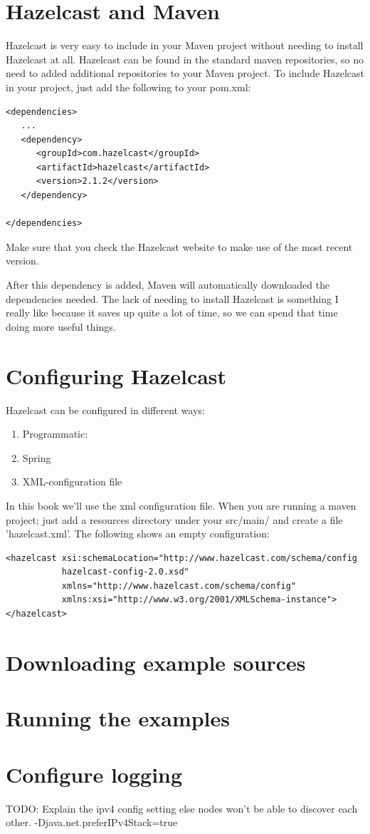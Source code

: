 \section{Hazelcast and Maven}
Hazelcast is very easy to include in your Maven project without needing to install Hazelcast at all. Hazelcast can be found in the standard maven repositories, so no need to added additional repositories to your Maven project. To include Hazelcast in your project, just add the following to your pom.xml:

\begin{verbatim}
<dependencies>	
   ...
   <dependency>
      <groupId>com.hazelcast</groupId>
      <artifactId>hazelcast</artifactId>
      <version>2.1.2</version>
   </dependency>

</dependencies>
\end{verbatim}	

Make sure that you check the Hazelcast website to make use of the most recent version. 

After this dependency is added, Maven will automatically downloaded the dependencies needed.  The lack of needing to install Hazelcast is something I really like because it saves up quite a lot of time, so we can spend that time doing more useful things.

\section{Configuring Hazelcast}
Hazelcast can be configured in different ways:
\begin{enumerate}
\item Programmatic:
\item Spring
\item XML-configuration file
\end{enumerate}
In this book we'll use the xml configuration file. When you are running a maven project; just add a resources directory under your src/main/ and create a file 'hazelcast.xml'. The following shows an empty configuration:
\begin{verbatim}
<hazelcast xsi:schemaLocation="http://www.hazelcast.com/schema/config
           hazelcast-config-2.0.xsd"
           xmlns="http://www.hazelcast.com/schema/config"
           xmlns:xsi="http://www.w3.org/2001/XMLSchema-instance">
</hazelcast>
\end{verbatim}

\section{Downloading example sources}

\section{Running the examples}

\section{Configure logging}

TODO: Explain the ipv4 config setting else nodes won't be able to discover each other.
-Djava.net.preferIPv4Stack=true

